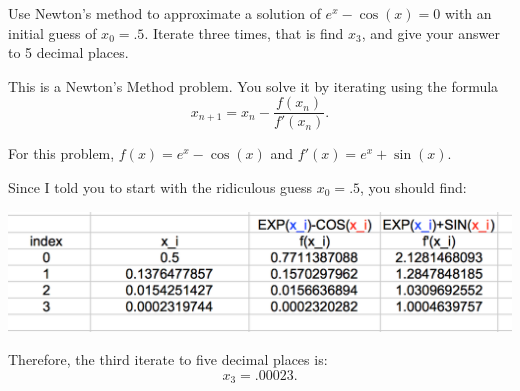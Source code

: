 \documentclass{ximera}
\author{Emma Smith Zbarsky}
\begin{document}
\begin{exercise}

Use Newton's method to approximate a solution of $e^x -\cos(x)=0$ with
an initial guess of $x_0=.5$. Iterate three times, that is find $x_3$,
and give your answer to 5 decimal places.


\begin{hint}
This is a Newton's Method problem. You solve it by iterating using the
formula \[x_{n+1} = x_n - \frac{f(x_n)}{f'(x_n)}.\]
\end{hint}


\begin{hint}
For this problem, $f(x) = e^x-\cos(x)$ and $f'(x) = e^x+\sin(x)$.

Since I told you to start with the ridiculous guess $x_0 = .5$, you
should find: 

\begin{image}\includegraphics{newtonsmethodsoln-ost1.png}\end{image}

 Therefore, the third
iterate to five decimal places is: \[x_3 = .00023.\]
\end{hint}


\begin{multipleChoice}
\end{multipleChoice}

\end{exercise}
\end{document}
